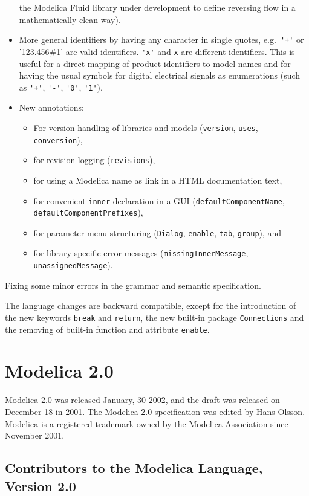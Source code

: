 \begin{itemize}
  the Modelica Fluid library under development to define reversing flow
  in a mathematically clean way).
\item
  More general identifiers by having any character in single quotes,
  e.g.\ \lstinline!'+'! or '123.456\#1' are valid identifiers. \lstinline!'x'! and \lstinline!x! are
  different identifiers. This is useful for a direct mapping of product
  identifiers to model names and for having the usual symbols for
  digital electrical signals as enumerations (such as \lstinline!'+'!, \lstinline!'-'!, \lstinline!'0'!,
  \lstinline!'1'!).
\item
  New annotations:
\begin{itemize}
\item For version handling of libraries and models (\lstinline!version!, \lstinline!uses!,
\lstinline!conversion!),
\item for revision logging (\lstinline!revisions!),
\item for using a Modelica name as link in a HTML documentation text,
\item for convenient \lstinline!inner! declaration in a GUI (\lstinline!defaultComponentName!,
\lstinline!defaultComponentPrefixes!),
\item for parameter menu structuring (\lstinline!Dialog!, \lstinline!enable!, \lstinline!tab!,
\lstinline!group!), and
\item for library specific error messages (\lstinline!missingInnerMessage!,
\lstinline!unassignedMessage!).
\end{itemize}
\end{itemize}
Fixing some minor errors in the grammar and semantic specification.

The language changes are backward compatible, except for the introduction of the new keywords \lstinline!break! and \lstinline!return!, the new built-in package \lstinline!Connections! and the removing of built-in function and attribute \lstinline!enable!.

\section{Modelica 2.0}\label{modelica-2-0}

Modelica 2.0 was released January, 30 2002, and the draft was released
on December 18 in 2001. The Modelica 2.0 specification was edited by
Hans Olsson. Modelica is a registered trademark owned by the Modelica
Association since November 2001.

\subsection{Contributors to the Modelica Language, Version 2.0}\label{contributors-to-the-modelica-language-version-2-0}

